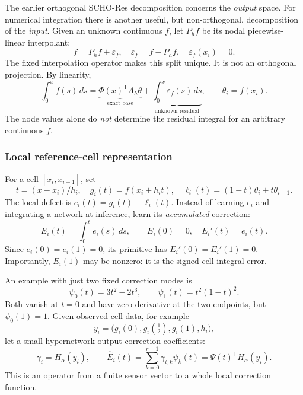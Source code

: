 The earlier orthogonal SCHO-Res decomposition concerns
the \emph{output} space. For numerical integration
there is another useful, but non-orthogonal, decomposition
of the \emph{input}. Given an unknown continuous $f$,
let $P_hf$ be its nodal piecewise-linear interpolant:
\begin{equation}
  \boxed{f=P_hf+\varepsilon_f,\quad
    \varepsilon_f=f-P_hf,\quad \varepsilon_f(x_i)=0.}
\end{equation}
The fixed interpolation operator makes this split unique.
It is not an orthogonal projection. By linearity,
\begin{equation}
  \boxed{
    \int_0^x f(s)\,ds=
    \underbrace{\Phi(x)^{\mathsf T}A_h\theta}_{\text{exact base}}
    +\underbrace{\int_0^x\varepsilon_f(s)\,ds}_{\text{unknown residual}},
    \qquad\theta_i=f(x_i).
  }
  \label{eq:scho-split-integral}
\end{equation}
The node values alone do \emph{not} determine the residual
integral for an arbitrary continuous $f$.

\subsubsection{Local reference-cell representation}

For a cell $[x_i,x_{i+1}]$, set
\begin{equation}
  t=(x-x_i)/h_i,\quad g_i(t)=f(x_i+h_it),\quad
  \ell_i(t)=(1-t)\theta_i+t\theta_{i+1}.
\end{equation}
The local defect is $e_i(t)=g_i(t)-\ell_i(t)$.
Instead of learning $e_i$ and integrating a network at
inference, learn its \emph{accumulated} correction:
\begin{equation}
  E_i(t)=\int_0^t e_i(s)\,ds,\qquad
  \boxed{E_i(0)=0,\quad E_i'(t)=e_i(t).}
  \label{eq:scho-defect-ode}
\end{equation}
Since $e_i(0)=e_i(1)=0$, its primitive has
$E_i'(0)=E_i'(1)=0$. Importantly, $E_i(1)$
may be nonzero: it is the signed cell integral error.

An example with just two fixed correction modes is
\begin{equation}
  \psi_0(t)=3t^2-2t^3,\qquad
  \psi_1(t)=t^2(1-t)^2.
\end{equation}
Both vanish at $t=0$ and have zero derivative at
the two endpoints, but $\psi_0(1)=1$.
Given observed cell data, for example
\begin{equation}
  y_i=\bigl(g_i(0),g_i(\tfrac12),g_i(1),h_i\bigr),
\end{equation}
let a small hypernetwork output correction coefficients:
\begin{equation}
  \boxed{\gamma_i=H_\alpha(y_i),\qquad
    \widehat E_i(t)=\sum_{k=0}^{r-1}\gamma_{i,k}\psi_k(t)
    =\Psi(t)^{\mathsf T}H_\alpha(y_i).}
  \label{eq:scho-cell-hypernetwork}
\end{equation}
This is an operator from a finite sensor vector to
a whole local correction function.

